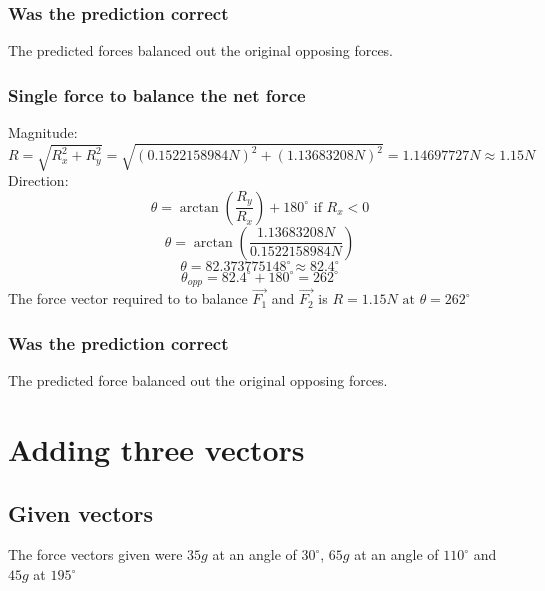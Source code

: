 \documentclass[11pt, letterpaper, includehead]{article}
\begin{document}
\subsubsection{Was the prediction correct} %
The predicted forces balanced out the original opposing forces. 

\subsubsection{Single force to balance the net force} %
Magnitude:
$$R = \sqrt{R_x^2 + R_y^2} = \sqrt{(0.1522158984N)^2 + (1.13683208N)^2} = 1.14697727N \approx \boxed{1.15N}$$
Direction:
$$\theta = \arctan \left( \frac{R_y}{R_x} \right) + 180^{\circ} \text{ if } R_x < 0$$
$$\theta = \arctan \left( \frac{1.13683208N}{0.1522158984N} \right)$$
$$\theta = 82.373775148^{\circ} \approx {82.4^{\circ}}$$
$$\theta_{opp} = 82.4^{\circ} + 180^{\circ} = \boxed{262^{\circ}}$$
The force vector required to to balance $\vec{F_1}$ and $\vec{F_2}$ is
$R = 1.15N \text{ at } \theta = 262^{\circ}$

\subsubsection{Was the prediction correct} %
The predicted force balanced out the original opposing forces. 

\section{Adding three vectors} %

\subsection{Given vectors} %
The force vectors given were $35g$ at an angle of $30^{\circ}$, $65g$ at an angle of $110^{\circ}$ and 
$45g$ at $195^{\circ}$
\pagebreak
\end{document}
